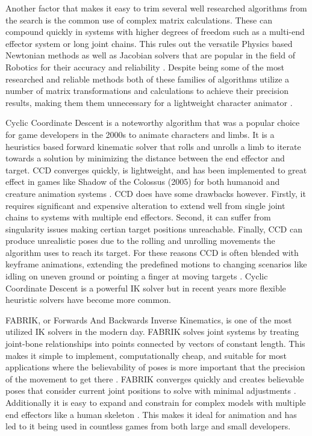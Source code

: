 \documentclass[10pt,twocolumn]{article}
\begin{document}
Another factor that makes it easy to trim several well researched algorithms from the search is the common use of complex matrix calculations. These can compound quickly in systems with higher degrees of freedom such as a multi-end effector system or long joint chains. This rules out the versatile Physics based Newtonian methods as well as Jacobian solvers that are popular in the field of Robotics for their accuracy and reliability \cite{newtonian}\cite{jacobianSingularity}. Despite being some of the most researched and reliable methods both of these families of algorithms utilize a number of matrix transformations and calculations to achieve their precision results, making them them unnecessary for a lightweight character animator \cite{litReview}.

Cyclic Coordinate Descent is a noteworthy algorithm that was a popular choice for game developers in the 2000s to animate characters and limbs. It is a heuristics based forward kinematic solver that rolls and unrolls a limb to iterate towards a solution by minimizing the distance between the end effector and target\cite{CCDBlog}. CCD converges quickly, is lightweight, and has been implemented to great effect in games like Shadow of the Colossus (2005) for both humanoid and creature animation systems \cite{ShadowofC}. CCD does have some drawbacks however. Firstly, it requires significant and expensive alteration to extend well from single joint chains to systems with multiple end effectors. Second, it can suffer from singularity issues making certian target positions unreachable. Finally, CCD can produce unrealistic poses due to the rolling and unrolling movements the algorithm uses to reach its target. For these reasons CCD is often blended with keyframe animations, extending the predefined motions to changing scenarios like idling on uneven ground or pointing a finger at moving targets \cite{baseFABRIK} \cite{CCDpaper}. Cyclic Coordinate Descent is a powerful IK solver but in recent years more flexible heuristic solvers have become more common.

FABRIK, or Forwards And Backwards Inverse Kinematics, is one of the most utilized IK solvers in the modern day. FABRIK solves joint systems by treating joint-bone relationships into points connected by vectors of constant length. This makes it simple to implement, computationally cheap, and suitable for most applications where the believability of poses is more important that the precision of the movement to get there \cite{FABRIKoptimized}. FABRIK converges quickly and creates believable poses that consider current joint positions to solve with minimal adjustments \cite{baseFABRIK}. Additionally it is easy to expand and constrain for complex models with multiple end effectors like a human skeleton \cite{extendFABRIK}. This makes it ideal for animation and has led to it being used in countless games from both large and small developers.
\end{document}
